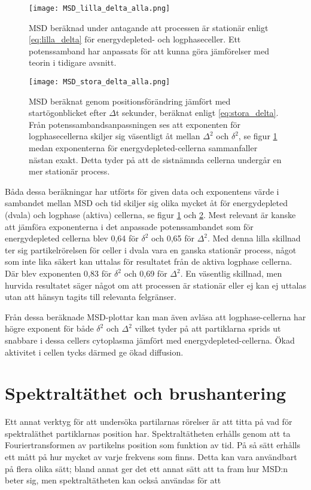 \begin{figure}
    \centering
    \texttt{[image: MSD\_lilla\_delta\_alla.png]}
    \caption{MSD beräknad under antagande att processen är stationär enligt \eqref{eq:lilla_delta} för energydepleted- och logphaseceller. Ett potenssamband har anpassats för att kunna göra jämförelser med teorin i tidigare avsnitt.}
    \label{fig:MSD_ld}
\end{figure}
\begin{figure}
    \centering
    \texttt{[image: MSD\_stora\_delta\_alla.png]}
    \caption{MSD beräknat genom positionsförändring jämfört med startögonblicket efter $\Delta$t sekunder, beräknat enligt \eqref{eq:stora_delta}. Från potenssambandsanpassningen ses att exponenten för logphasecellerna skiljer sig väsentligt åt mellan $\Delta^2$ och $\delta^2$, se figur \ref{fig:MSD_ld} medan exponenterna för energydepleted-cellerna sammanfaller nästan exakt. Detta tyder på att de sistnämnda cellerna undergår en mer stationär process.}
    \label{fig:MSD_sd}
\end{figure}

Båda dessa beräkningar har utförts för given data och exponentens värde i sambandet mellan MSD och tid skiljer sig olika mycket åt för energydepleted (dvala) och logphase (aktiva) cellerna, se figur \ref{fig:MSD_ld} och \ref{fig:MSD_sd}. Mest relevant är kanske att jämföra exponenterna i det anpassade potenssambandet som för energydepleted cellerna blev 0,64 för $\delta^2$ och 0,65 för $\Delta^2$. Med denna lilla skillnad ter sig partikelrörelsen för celler i dvala vara en ganska stationär process, något som inte lika säkert kan uttalas för resultatet från de aktiva logphase cellerna. Där blev exponenten 0,83 för $\delta^2$ och 0,69 för $\Delta^2$. En väsentlig skillnad, men hurvida resultatet säger något om att processen är stationär eller ej kan ej uttalas utan att hänsyn tagits till relevanta felgränser.

Från dessa beräknade MSD-plottar kan man även avläsa att logphase-cellerna har högre exponent  för både $\delta^2$ och $\Delta^2$ vilket tyder på att partiklarna sprids ut snabbare i dessa cellers cytoplasma jämfört med energydepleted-cellerna. Ökad aktivitet i cellen tycks därmed ge ökad diffusion.


\section{Spektraltäthet och brushantering}
Ett annat verktyg för att undersöka partilarnas rörelser är att titta på vad för spektraläthet partiklarnas position har. Spektraltätheten erhålls genom att ta Fouriertransformen av partikelns position som funktion av tid. På så sätt erhålls ett mått på hur mycket av varje frekvens som finns. Detta kan vara användbart på flera olika sätt; bland annat ger det ett annat sätt att ta fram hur MSD:n beter sig, men spektraltätheten kan också användas för att 

